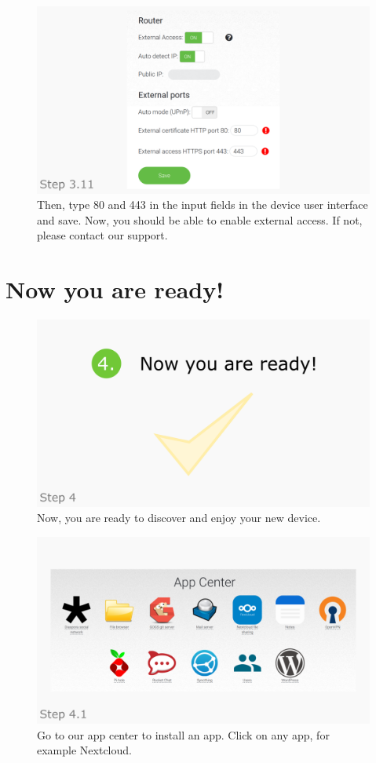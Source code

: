 \documentclass[a4paper,12pt]{article}
\begin{document}
\begin{figure}[htbp!]
	\centering
	\includegraphics[width=0.7\linewidth]{../frames/46.png}
	\caption{Then, type 80 and 443 in the input fields in the device user interface and save. Now, you should be able to enable external access. If not, please contact our support.}
	\label{fig:33}
\end{figure}

\section{Now you are ready!}

\begin{figure}[htbp!]
	\centering
	\includegraphics[width=0.7\linewidth]{../frames/47.png}
	\caption{Now, you are ready to discover and enjoy your new device.}
	\label{fig:34}
\end{figure}

\begin{figure}[htbp!]
	\centering
	\includegraphics[width=0.7\linewidth]{../frames/48.png}
	\caption{Go to our app center to install an app. Click on any app, for example Nextcloud.}
	\label{fig:35}
\end{figure}
\end{document}

